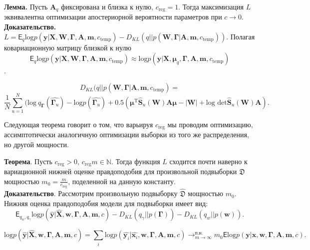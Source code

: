 \textbf{Лемма.}  Пусть $\mathbf{A}_q$ фиксирована и близка к нулю, $c_{\text{reg}} =1$.  Тогда максимизация $L$ эквивалентна оптимизации апостериорной вероятности параметров при $c \to 0$.\\
\textbf{Доказательство.} 
$L = \mathsf{E}_{q}\text{log} p(\mathbf{y}|\mathbf{X},\mathbf{W}, \boldsymbol{\Gamma}, \mathbf{A},\mathbf{m}, c_{\text{temp}}) - {D_{KL}}(q||p(\mathbf{W}, \boldsymbol{\Gamma}| \mathbf{A},\mathbf{m}, c_{\text{temp}})).$
Полагая ковариационную матрицу близкой к нулю $$ \mathsf{E}_{q}\text{log} p(\mathbf{y}|\mathbf{X},\mathbf{W}, \boldsymbol{\Gamma}, \mathbf{A},\mathbf{m}, c_{\text{temp}}) \approx \text{log} p(\mathbf{y}|\mathbf{X},\boldsymbol{\mu}_q, \boldsymbol{\Gamma}, \mathbf{A},\mathbf{m}, c_{\text{temp}})$$.

$$
   {D_{KL}}(q||p(\mathbf{W}, \boldsymbol{\Gamma}| \mathbf{A},\mathbf{m}, c_{\text{temp}}) = 
$$
$$
    \frac{1}{N}\sum_{u=1}^N (\text{log}~q_{\boldsymbol{\Gamma}}(\hat{\boldsymbol{\Gamma}_u}) - \text{log}p(\hat{\boldsymbol{\Gamma}_u}) + 0.5(\boldsymbol{\mu}^{\text{T}}\hat{\mathbf{S}}_u(\mathbf{W})\mathbf{A}\boldsymbol{\mu} - |\mathbf{W}| + \text{log det}\hat{\mathbf{S}}_u(\mathbf{W})\mathbf{A}).
$$

Следующая теорема говорит о том, что варьируя $c_{\text{reg}}$ мы проводим оптимизацию, ассимптотически аналогичную оптимизации выборки из того же распределения, но другой мощности.

\textbf{Теорема}. Пусть $c_{\text{reg}} > 0$, $c_{\text{reg}} m \in \mathbb{N}.$
Тогда функция $L$ сходится почти наверно к вариационной нижней оценке правдоподобия для произвольной подвыборки  $\mathfrak{D}$ 
мощностью $m_0 = \frac{m}{c_{\text{reg}}}$, поделенной на данную константу.\\

\textbf{Доказательство}. Рассмотрим произвольную подвыборку $\hat{\mathfrak{D}}$ мощностью $m_0$. Нижняя оценка правдоподобия модели для подвыборки имеет вид:
\[
 \mathsf{E}_{q_w,q_\gamma}\text{log} p(\hat{\mathbf{y}}|\hat{\mathbf{X}},\mathbf{w}, \boldsymbol{\Gamma}, \mathbf{A},\mathbf{m}, c) - {D_{KL}}(q_\gamma||p(\boldsymbol{\Gamma})) - {D_{KL}}(q_{w}||p(\mathbf{w})).
\]

\[
\text{log} p(\hat{\mathbf{y}}|\hat{\mathbf{X}},\mathbf{w}, \boldsymbol{\Gamma}, \mathbf{A},\mathbf{m}, c) = \sum_i \text{log} p(\hat{\mathbf{y}_i}|\hat{\mathbf{x}_i},\mathbf{w}, \boldsymbol{\Gamma}, \mathbf{A},\mathbf{m}, c) \to^{\text{п.н.}}_{m \to \infty} m_0\mathsf{E}\text{log} p(\mathbf{y}|{\mathbf{x}},\mathbf{w}, \boldsymbol{\Gamma}, \mathbf{A},\mathbf{m}, c).
\]

